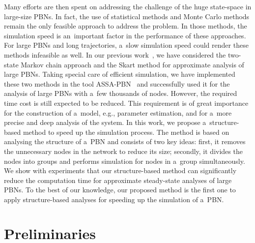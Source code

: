 \documentclass[runningheads,a4paper]{llncs}
\begin{document}
Many efforts are then spent on addressing the challenge of the huge state-space in large-size
PBNs.  In fact, the use of statistical methods and Monte Carlo methods remain the only feasible
approach to address the problem. In those methods, the simulation speed is an~important factor in
the performance of these approaches. For large PBNs and long trajectories, a~slow simulation speed
could render these methods infeasible as well. In our previous work~\cite{MPY15}, we have
considered the two-state Markov chain approach and the Skart method for approximate analysis of
large PBNs. Taking special care of efficient simulation, we have implemented these two methods in
the tool \textsf{ASSA-PBN}~\cite{assa} and successfully used it for the analysis of large PBNs
with a~few thousands of nodes. However, the required time cost is still expected to be reduced.
This requirement is of great importance for the construction of a~model, e.g., parameter
estimation, and for a~more precise and deep analysis of the system. In this work, we propose
a~structure-based method to speed up the simulation process. The method is based on analysing the
structure of a~PBN and consists of two key ideas: first, it removes the unnecessary nodes in the
network to reduce its size; secondly, it divides the nodes into groups and performs simulation for
nodes in a~group simultaneously. We show with experiments that our structure-based method can
significantly reduce the computation time for approximate steady-state analyses of large PBNs.
To the best of our knowledge, our proposed method is the first one to apply structure-based
analyses for speeding up the simulation of a~PBN.


\section{Preliminaries}
\label{sec:pre}

\end{document}
